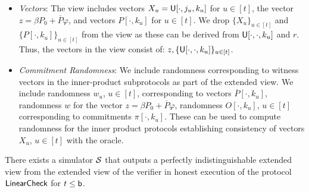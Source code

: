 \begin{itemize}
\item {\em Vectors}: The view includes vectors
$X_u=\mathsf{U}[\cdot,j_u,k_u]$ for $u\in [t]$, the vector $z = \beta P_0 +
\overline{P} \varphi$,  and vectors $P[\cdot, k_u]$ for $u\in [t]$.  We drop
$\{X_u\}_{u\in [t]}$ and $\{P[\cdot,k_u]\}_{u\in [t]}$ from the view as these
can be derived from $\mathsf{U}[\cdot,\cdot,k_u]$ and $r$. Thus, the vectors in the
view consist of: $z,\{\mathsf{U}[\cdot,\cdot,k_u]\}_{u\in [t]}$.

\item {\em Commitment Randomness}: We include randomness corresponding to
witness vectors in the inner-product subprotocols as part of the extended view.
We include randomness $w_u$, $u\in
[t]$, corresponding to vectors $\overline{P}[\cdot,k_u]$, 
randomness $w$ for the vector $z=\beta P_0 +
\overline{P}\varphi$, randomness $O[\cdot,k_u]$, $u\in [t]$ 
corresponding to commitments $\pi[\cdot,k_u]$. These can be used to compute
randomness for the inner product protocols establishing consistency of vectors
$X_u$, $u\in [t]$ with the oracle.
\end{itemize}
\begin{lemma}\label{lem:simlincheck}
	There exists a simulator $\mathcal{S}$ that outputs a perfectly indistinguishable extended view
	from the extended view of the verifier in honest execution of the protocol
	$\mathsf{LinearCheck}$ for $t\leq \mathsf{b}$.
\end{lemma}


